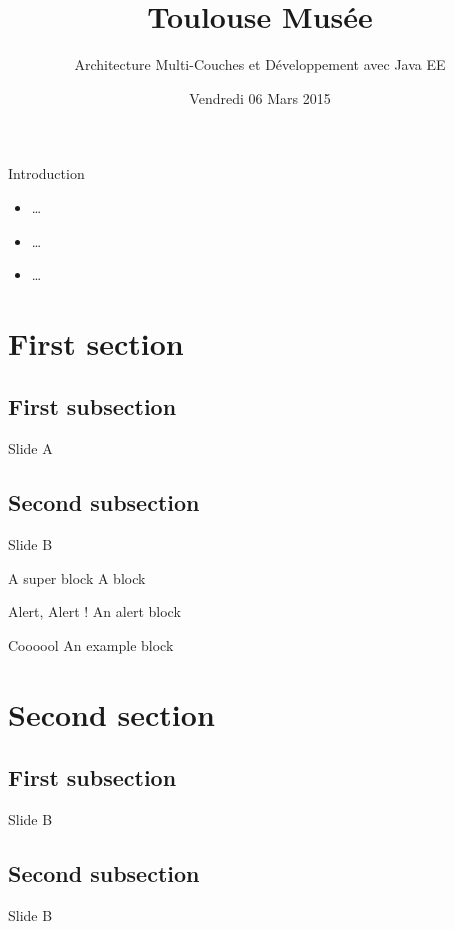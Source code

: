 \documentclass{beamer}
\title[] %
{Toulouse Musée}
\subtitle{Architecture Multi-Couches et Développement avec Java EE}
\author[
\textbf{\color{white} F}lorent\\
{A}ntoine
]{\authors}
\author[
{F}lorent\\
\textbf{\color{white} A}ntoine
]{\authors}
\author[
Florent\\
Antoine
]{\authors}
\institute[] 
{
  Universit\'e Toulouse III -- Paul Sabatier \\
  M1 Informatique -- Développement Logiciel 
  \vspace{-10px}
}
\date[ ~ ~ ~ 05 / 03 / 2015] %
{Vendredi 06 Mars 2015}
\begin{document}
	\begin{frame}
		\titlepage
	\end{frame}
	\begin{frame}
		\tableofcontents
	\end{frame}
	\begin{frame}{Introduction}
		\begin{itemize}
			\item \ldots 
			\item \ldots 
			\item \ldots
		\end{itemize}
	\end{frame}
	\section{First section}
	\subsection{First subsection}
	\begin{frame}{Slide A}
		
	\end{frame}
	\subsection{Second subsection}

	\begin{frame}{Slide B}
		\begin{block}{A super block}
			A block	
		\end{block}
		\begin{alertblock}{Alert, Alert !}
			An alert block
		\end{alertblock}

		\begin{exampleblock}{Coooool}
			An example block	
		\end{exampleblock}
	\end{frame}
	\section{Second section}
	\subsection{First subsection}
	\begin{frame}{Slide B}
	\end{frame}
	\subsection{Second subsection}
	\begin{frame}{Slide B}
	\end{frame}
\end{document}
